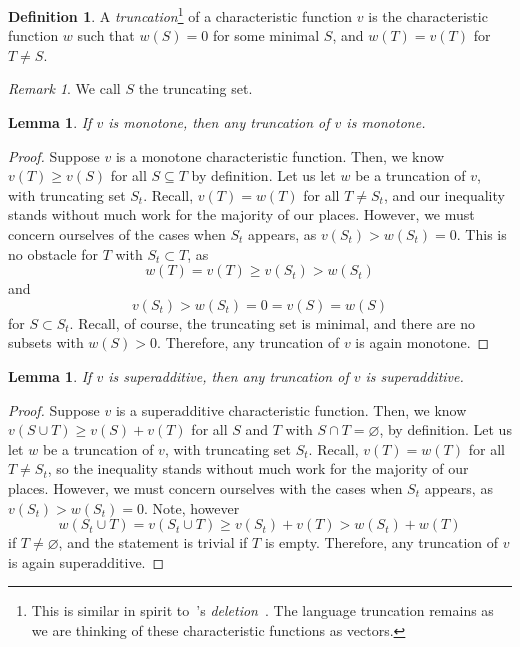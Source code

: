 \documentclass[12pt,letterpaper,final]{article}
\theoremstyle{plain}
\theoremstyle{plain}
\theoremstyle{plain}
\newtheorem{lemma}[theorem]{Lemma}
\theoremstyle{plain}
\theoremstyle{plain}
\theoremstyle{plain}
\theoremstyle{plain}
\theoremstyle{definition}
\newtheorem{definition}{Definition}[section]
\theoremstyle{definition}
\theoremstyle{definition}
\theoremstyle{definition}
\theoremstyle{definition}
\theoremstyle{remark}
\newtheorem*{remark}{Remark}
\theoremstyle{remark}
\theoremstyle{remark}
\theoremstyle{remark}
\begin{document}
\begin{definition}
  A \emph{truncation}\footnote{This is similar in spirit to~\citeauthor{Weber78}'s
    \emph{deletion}~\cite[Section 6]{Weber78}. The language truncation
    remains as we are thinking of these characteristic functions as
    vectors.} of a characteristic
  function \(v\) is the characteristic function \(w\) such that
  \(w(S) = 0\) for some minimal \(S\), and \(w(T) = v(T)\) for \(T\neq S\).
\end{definition}

\begin{remark}
  We call \(S\) the truncating set. 
\end{remark}

\begin{lemma}
  If \(v\) is monotone, then any truncation of \(v\) is monotone.
\end{lemma}

\begin{proof}
  Suppose \(v\) is a monotone characteristic function. Then, we know
  \(v(T) \geq v(S)\) for all \(S\subseteq T\) by definition. Let us
  let \(w\) be a truncation of \(v\), with truncating set
  \(S_t\). Recall, \(v(T) = w(T)\) for all \(T\neq S_t\), 
  and our inequality stands without much work for the majority
  of our places. However, we must concern ourselves of the cases when
  \(S_t\) appears, as \(v(S_t) > w(S_t) = 0\). This is no obstacle for
  \(T\) with \(S_t \subset T\), as
  \[
    w(T) = v(T) \geq v(S_t) > w(S_t)
  \]
  and
  \[
    v(S_t) > w(S_t)=0= v(S) = w(S)
  \]
  for \(S\subset S_t\). 
  Recall, of course, the truncating set is minimal, and there are no
  subsets with \(w(S)>0\). 
  Therefore, any truncation of \(v\) is again monotone.
\end{proof}

\begin{lemma}
  If \(v\) is superadditive, then any truncation of \(v\) is superadditive.
\end{lemma}

\begin{proof}
  Suppose \(v\) is a superadditive characteristic function. Then, we know
  \(v(S\cup T) \geq v(S) +v(T)\) for all \(S\) and \(T\) with
  \(S\cap T = \varnothing\), by definition. Let us let \(w\) be a
  truncation of \(v\), with truncating set \(S_t\). Recall,
  \(v(T) = w(T)\) for all \(T\neq S_t\), so the inequality
  stands without much work for the majority of our places. However, we
  must concern ourselves with the cases when \(S_t\) appears, as
  \(v(S_t) > w(S_t) = 0\). Note, however
  \[
    w(S_t\cup T) = v(S_t\cup T) \geq v(S_t) +v(T) > w(S_t) +w(T)
  \]
  if \(T\neq \varnothing\), and the statement is trivial if \(T\)
  is empty. Therefore, any truncation of \(v\) is again superadditive.
\end{proof}
\end{document}
